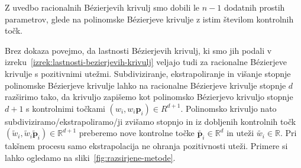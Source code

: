 \documentclass[isrm2, tisk]{fmfdelo}
\newcommand{\R}{\mathbb R}
\newcommand{\p}{\mathbf{p}}
\begin{document}
    \begin{opomba}
        Z uvedbo racionalnih Bézierjevih krivulj smo dobili le $n-1$ dodatnih prostih parametrov, glede na polinomske Bézierjeve krivulje z istim številom kontrolnih točk.
    \end{opomba}
    Brez dokaza povejmo, da lastnosti Bézierjevih krivulj, ki smo jih podali v izreku~\ref{izrek:lastnosti-bezierjevih-krivulj} veljajo tudi za racionalne Bézierjeve krivulje s pozitivnimi utežmi.
    Subdiviziranje, ekstrapoliranje in višanje stopnje polinomske Bézierjeve krivulje lahko na racionalne Bézierjeve krivulje stopnje $d$ razširimo tako, da krivuljo zapišemo kot polinomsko Bézierjevo krivuljo stopnje $d+1$ s kontrolnimi točkami  $(w_i,w_{i}\p_i)\in R^{d+1}$.
    Polinomsko krivuljo nato subdiviziramo/ekstrapoliramo/ji zvišamo stopnjo in iz dobljenih kontrolnih točk $(\tilde{w}_i,\tilde{w}_{i}\tilde{\p}_i)\in\R^{d+1}$ preberemo nove kontrolne točke $\tilde{\p_i}\in\R^d$ in uteži $\tilde{w_i}\in\R$.
    Pri takšnem procesu samo ekstrapolacija ne ohranja pozitivnosti uteži.
    Primere si lahko ogledamo na sliki~\ref{fig:razsirjene-metode}.
\end{document}
